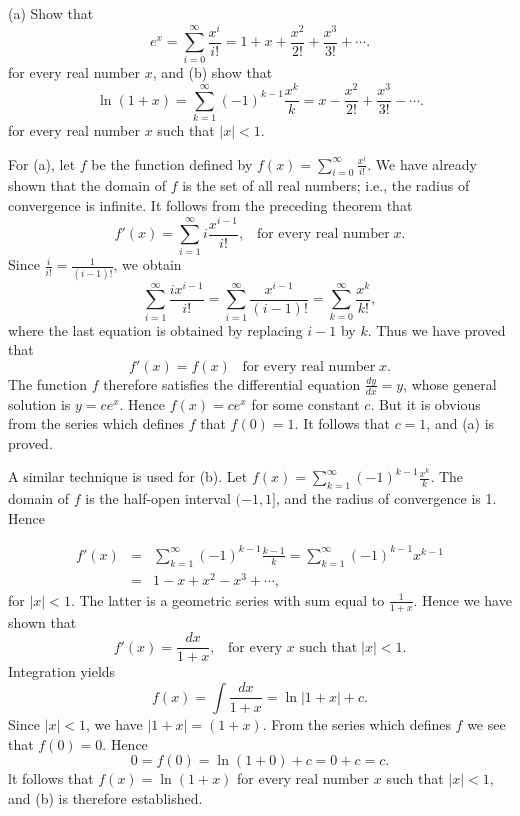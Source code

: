 \begin{example}
(a) Show that 
$$
e^x = \sum_{i=0}^\infty \frac{x^i}{i!} = 1 + x + \frac{x^2}{2!} + \frac{x^3}{3!} + \cdots .
$$
\noindent for every real number $x$, and (b) show that
$$
\ln(1 + x) = \sum_{k=1}^\infty (-1)^{k-1} \frac{x^k}{k} =  x - \frac{x^2}{2!} + \frac{x^3}{3!} - \cdots .
$$
\noindent for every real number $x$ such that $|x| < 1$.

For (a), let $f$ be the function defined by $f(x) = \sum_{i=0}^\infty \frac{x^i}{i!}$. We have already shown that the domain of $f$ is the set of all real numbers; i.e., the radius of convergence is infinite. It follows from the preceding theorem that
$$
f'(x) = \sum_{i=1}^\infty i \frac{x^{i-1}}{i!} , \;\;\;\mbox{for every real number}\; x.
$$
\noindent Since $\frac{i}{i!} = \frac{1}{(i- 1)!}$, we obtain
$$
\sum_{i=1}^\infty \frac{ix^{i-1}}{i!} = \sum_{i=1}^\infty \frac{x^{i-1}}{(i-1)!} = \sum_{k=0}^\infty \frac{x^k}{k!},
$$
\noindent where the last equation is obtained by replacing $i - 1$ by $k$. Thus we have proved that
$$
f'(x) = f(x)\;\;\;\mbox{for every real number}\; x. 
$$
\noindent The function $f$ therefore satisfies the differential equation $\frac{dy}{dx} = y$, whose general solution is $y = ce^x$. Hence $f(x) = ce^x$ for some constant $c$. But it is obvious from the series which defines $f$ that $f(0) = 1$. It follows that $c = 1$, and (a) is proved.

A similar technique is used for (b). Let $f(x) = \sum_{k=1}^\infty (-1)^{k-1} \frac{x^k}{k}$. The domain of $f$ is the half-open interval $(-1, 1]$, and the radius of convergence is 1. Hence

\begin{eqnarray*}
f'(x) &=& \sum_{k=1}^\infty (-1)^{k-1} \frac{k-1}{k} 
= \sum_{k=1}^\infty (-1 )^{k-1} x^{k-1}\\
&=& 1 - x + x^2 - x^3 + \cdots ,
\end{eqnarray*}
for $|x| < 1$. The latter is a geometric series with sum equal to $\frac{1}{1 + x}$. Hence we have shown that  
$$
f'(x) = \frac{dx}{1+x}, \;\;\;\mbox{for every $x$ such that}\; |x| < 1.
$$
\noindent Integration yields
$$
f(x) = \int \frac{dx}{1+x} = \ln |1 +x| + c.
$$
\noindent Since $|x| < 1$, we have $|1 + x| = (1 + x)$. From the series which defines $f$ we see that $f(0) = 0$. Hence
$$
0 = f(0) = \ln(1 + 0) + c = 0 + c = c.
$$
\noindent lt follows that $f(x) = \ln(1 + x)$ for every real number $x$ such that $|x| < 1$, and (b) is therefore established.
\end{example}

